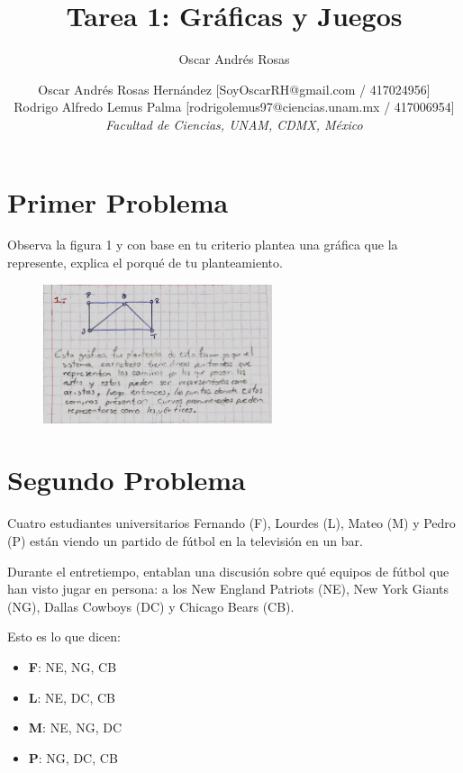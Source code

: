 \documentclass[journal,12pt,onecolumn]{IEEEtran}                %
\author{Oscar Andrés Rosas}                                     %
\theoremstyle{break}                                            %
\begin{document}
\title{Tarea 1: Gráficas y Juegos}

\author{
    Oscar Andrés Rosas Hernández [SoyOscarRH@gmail.com / 417024956]                 \\
    Rodrigo Alfredo Lemus Palma  [rodrigolemus97@ciencias.unam.mx / 417006954]      \\[1em]
    \textit{
    Facultad de Ciencias, UNAM, CDMX, México
    }
}


\maketitle
    \section*{Primer Problema}
        Observa la figura 1 y con base en tu criterio plantea una gráfica que la represente, explica 
        el porqué de tu planteamiento.
        \begin{figure}[h]
            \includegraphics[width=0.6\textwidth]{1}
        \end{figure}

    \section*{Segundo Problema}
        Cuatro estudiantes universitarios Fernando (F), Lourdes (L), Mateo (M) y Pedro (P)
        están viendo un partido de fútbol en la televisión en un bar. 
        
        Durante el entretiempo, entablan una discusión sobre qué equipos de fútbol 
        que han visto jugar en persona: a los New England Patriots (NE), 
        New York Giants (NG), Dallas Cowboys (DC) y Chicago Bears (CB). 
        
        Esto es lo que dicen:
        \begin{itemize}
            \item \textbf{F}: NE, NG, CB
            \item \textbf{L}: NE, DC, CB
            \item \textbf{M}: NE, NG, DC
            \item \textbf{P}: NG, DC, CB
        \end{itemize}
        
\end{document}
